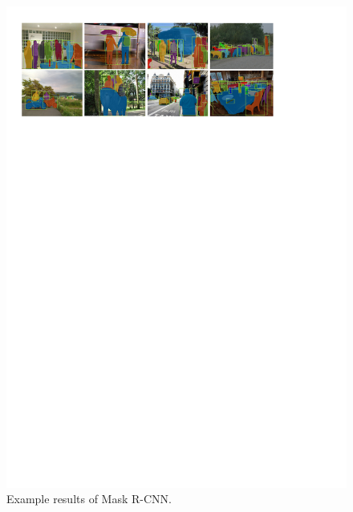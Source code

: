 \begin{figure}[!h]
	\centering
	\includegraphics[width=\fig\textwidth]{2-02.pdf}
    \caption[Example results of Mask R-CNN]{Example results of Mask R-CNN.}
    \label{fig:rcnnres}
\end{figure}